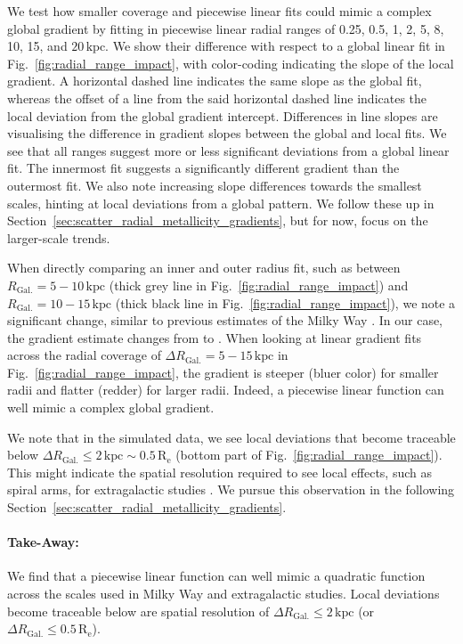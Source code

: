 \documentclass[twocolumn,apj,numberedappendix,appendixfloats,twocolappendix]{openjournal}
\begin{document}
\begin{CJK*}{UTF8}{gbsn}
We test how smaller coverage and piecewise linear fits could mimic a complex global gradient by fitting in piecewise linear radial ranges of 0.25, 0.5, 1, 2, 5, 8, 10, 15, and $20\,\mathrm{kpc}$. We show their difference with respect to a global linear fit in Fig.~\ref{fig:radial_range_impact}, with color-coding indicating the slope of the local gradient. A horizontal dashed line indicates the same slope as the global fit, whereas the offset of a line from the said horizontal dashed line indicates the local deviation from the global gradient intercept. Differences in line slopes are visualising the difference in gradient slopes between the global and local fits. We see that all ranges suggest more or less significant deviations from a global linear fit. The innermost fit suggests a significantly different gradient than the outermost fit. We also note increasing slope differences towards the smallest scales, hinting at local deviations from a global pattern. We follow these up in Section~\ref{sec:scatter_radial_metallicity_gradients}, but for now, focus on the larger-scale trends.

When directly comparing an inner and outer radius fit, such as between $R_\mathrm{Gal.} = 5-10\,\mathrm{kpc}$ (thick grey line in Fig.~\ref{fig:radial_range_impact}) and $R_\mathrm{Gal.} = 10-15\,\mathrm{kpc}$ (thick black line in Fig.~\ref{fig:radial_range_impact}), we note a significant change, similar to previous estimates of the Milky Way \citep[e.g.][]{Yong2012, Lemasle2008}. In our case, the gradient estimate changes from  to . When looking at linear gradient fits across the radial coverage of $\Delta R_\mathrm{Gal.} = 5-15\,\mathrm{kpc}$ in Fig.~\ref{fig:radial_range_impact}, the gradient is steeper (bluer color) for smaller radii and flatter (redder) for larger radii. Indeed, a piecewise linear function can well mimic a complex global gradient.

We note that in the simulated data, we see local deviations that become traceable below $\Delta R_\mathrm{Gal.} \leq 2\,\mathrm{kpc} \sim 0.5\,\mathrm{R_e}$ (bottom part of Fig.~\ref{fig:radial_range_impact}). This might indicate the spatial resolution required to see local effects, such as spiral arms, for extragalactic studies \citep[see also][]{Krumholz2018b, Li2024b}. We pursue this observation in the following Section~\ref{sec:scatter_radial_metallicity_gradients}.

\paragraph*{Take-Away:} We find that a piecewise linear function can well mimic a quadratic function across the scales used in Milky Way and extragalactic studies. Local deviations become traceable below are spatial resolution of $\Delta R_\mathrm{Gal.} \leq 2\,\mathrm{kpc}$ (or $\Delta R_\mathrm{Gal.} \leq 0.5\,\mathrm{R_e}$).


\end{CJK*}
\end{document}
